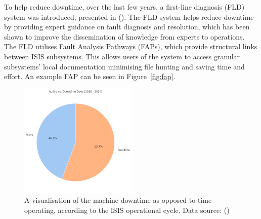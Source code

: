 \documentclass[10pt,oneside]{report}
\begin{document}
To help reduce downtime, over the last few years, a first-line diagnosis (FLD) system was introduced, presented in (\citet{fld2017}). The FLD system helps reduce downtime by providing expert guidance on fault diagnosis and resolution, which has been shown to improve the dissemination of knowledge from experts to operations. The FLD utilises Fault Analysis Pathways (FAPs), which provide structural links between ISIS subsystems. This allows users of the system to access granular subsystems' local documentation minimising file hunting and saving time and effort. An example FAP can be seen in Figure~\ref{fig:fap}.

\begin{figure}[htbp]
    \centering
    \includegraphics[width=0.5\textwidth]{isisDowntime.png}
    \caption{A visualisation of the machine downtime as opposed to time operating, according to the ISIS operational cycle. Data source: (\citet{isisbeamoperations2024})}\label{fig:isisDowntime}
\end{figure}
\end{document}
